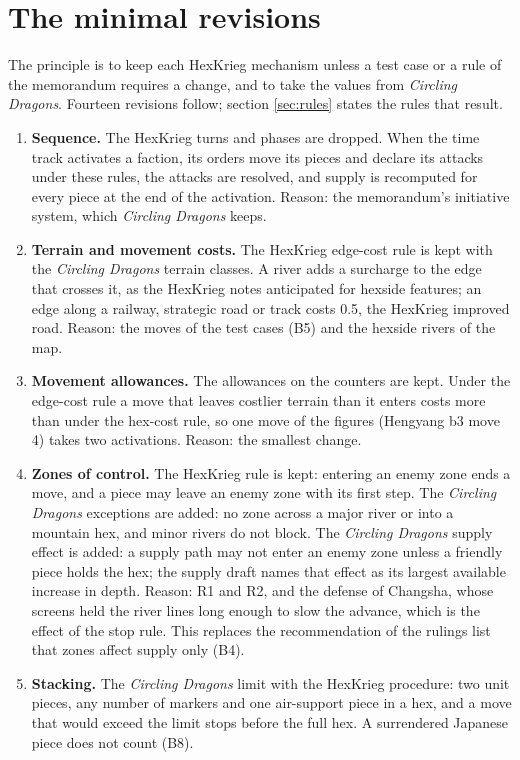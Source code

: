 \documentclass[11pt]{article}
\begin{document}
\section{The minimal revisions}\label{sec:revisions}
The principle is to keep each HexKrieg mechanism unless a test case or a rule of the memorandum requires a change, and to take the values from \emph{Circling Dragons}. Fourteen revisions follow; section \ref{sec:rules} states the rules that result.
\begin{enumerate}[label=M\arabic*.,leftmargin=*,itemsep=3pt]
\item \textbf{Sequence.} The HexKrieg turns and phases are dropped. When the time track activates a faction, its orders move its pieces and declare its attacks under these rules, the attacks are resolved, and supply is recomputed for every piece at the end of the activation. Reason: the memorandum's initiative system, which \emph{Circling Dragons} keeps.
\item \textbf{Terrain and movement costs.} The HexKrieg edge-cost rule is kept with the \emph{Circling Dragons} terrain classes. A river adds a surcharge to the edge that crosses it, as the HexKrieg notes anticipated for hexside features; an edge along a railway, strategic road or track costs 0.5, the HexKrieg improved road. Reason: the moves of the test cases (B5) and the hexside rivers of the map.
\item \textbf{Movement allowances.} The allowances on the counters are kept. Under the edge-cost rule a move that leaves costlier terrain than it enters costs more than under the hex-cost rule, so one move of the figures (Hengyang b3 move 4) takes two activations. Reason: the smallest change.
\item \textbf{Zones of control.} The HexKrieg rule is kept: entering an enemy zone ends a move, and a piece may leave an enemy zone with its first step. The \emph{Circling Dragons} exceptions are added: no zone across a major river or into a mountain hex, and minor rivers do not block. The \emph{Circling Dragons} supply effect is added: a supply path may not enter an enemy zone unless a friendly piece holds the hex; the supply draft names that effect as its largest available increase in depth. Reason: R1 and R2, and the defense of Changsha, whose screens held the river lines long enough to slow the advance, which is the effect of the stop rule. This replaces the recommendation of the rulings list that zones affect supply only (B4).
\item \textbf{Stacking.} The \emph{Circling Dragons} limit with the HexKrieg procedure: two unit pieces, any number of markers and one air-support piece in a hex, and a move that would exceed the limit stops before the full hex. A surrendered Japanese piece does not count (B8).

\end{enumerate}
\end{document}
